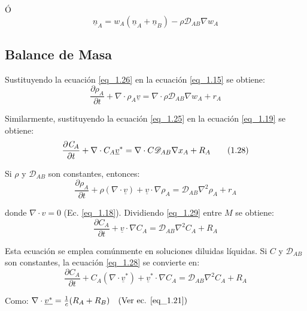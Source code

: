 Ó
\begin{equation}
	\underline{n}_A = w_A (\underline{n}_A + \underline{n}_B) - \rho \mathscr{D}_{AB} \nabla w_A  \tag{1.26}\label{eq_1.26}
\end{equation}

 \subsection{Balance de Masa}
 Sustituyendo la ecuación \ref{eq_1.26} en la ecuación \ref{eq_1.15} se obtiene:
 \begin{equation}
 	\frac{\partial \rho_A}{\partial t} + \nabla \cdot \rho_A \underline{v} = \nabla \cdot \rho \mathscr{D}_{AB} \nabla w_A + r_A \tag{1.27}\label{eq_1.27}
 \end{equation}
 
 Similarmente, sustituyendo la ecuación \ref{eq_1.25} en la ecuación \ref{eq_1.19} se obtiene:
 \begin{equation}
 	\frac{\partial \emph{C}_A}{\partial t} + \nabla \cdot C_A \underline{v}^* = \nabla \cdot C \mathscr{D}_{AB} \nabla x_A + R_A  \tag{1.28}\label{eq_1.28}
 \end{equation}
 
 Si $\rho$ y $\mathscr{D}_{AB}$ son constantes, entonces:
 \begin{equation}
 	\frac{\partial \rho_A}{\partial t} + \rho  (\nabla\cdot \underline{v})+\underline{v} \cdot \nabla \rho_A = \mathscr{D}_{AB} \nabla^2 \rho_A + r_A  \tag{1.29}\label{eq_1.29}
 \end{equation}
 
 donde $\nabla \cdot v = 0$ (Ec. \ref{eq_1.18}). Dividiendo \ref{eq_1.29} entre $M$ se obtiene:
 \begin{equation}
 	\frac{\partial C_A}{\partial t} + \underline{v} \cdot \nabla C_A = \mathscr{D}_{AB} \nabla^2 C_A + R_A  \tag{1.30} \label{eq_1.30}
 \end{equation}
 
 Esta ecuación se emplea comúnmente en soluciones diluidas líquidas. Si $C$ y $\mathscr{D}_{AB}$ son constantes, la ecuación \ref{eq_1.28} se convierte en:
 \begin{equation}
 	\frac{\partial C_A}{\partial t} +C_A (\nabla \cdot \underline{v}^*)+ \underline{v}^*\cdot\nabla C_A  = \mathscr{D}_{AB} \nabla^2 C_A + R_A \tag {1.31}\label{eq_1.31}
 \end{equation}
 
 Como: $	\nabla \cdot \underline{v^*}= \frac{1}{c} (R_A + R_B) \quad \text{(Ver ec. \ref{eq_1.21})}$
 
